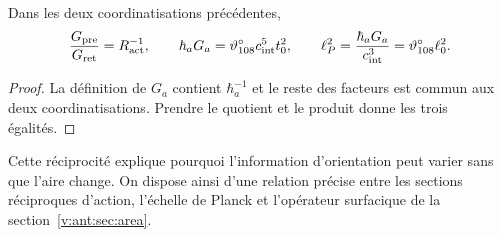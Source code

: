 \begin{proposition}
Dans les deux coordinatisations précédentes,
\[
\frac{G_{\rm pre}}{G_{\rm ret}}=R_{\rm act}^{-1},\qquad
\hbar_aG_a=\vartheta^\circ_{108}c_{\rm int}^5t_0^2,
\qquad
\ell_P^2=\frac{\hbar_aG_a}{c_{\rm int}^3}
=\vartheta^\circ_{108}\ell_0^2.
\]
\end{proposition}
\begin{proof}
La définition de $G_a$ contient $\hbar_a^{-1}$ et le reste des facteurs
est commun aux deux coordinatisations. Prendre le quotient et le produit donne
les trois égalités.
\end{proof}
Cette réciprocité explique pourquoi l'information d'orientation peut
varier sans que l'aire change. On dispose ainsi d'une relation précise
entre les sections réciproques d'action, l'échelle de Planck et l'opérateur surfacique
de la section~\ref{v:ant:sec:area}.
